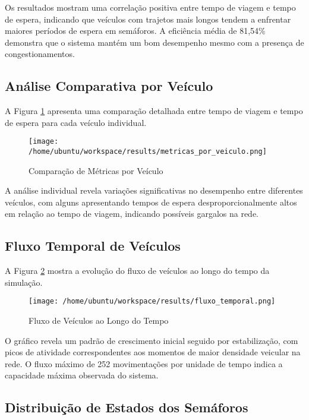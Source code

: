 \documentclass[12pt,a4paper]{article}
\begin{document}
Os resultados mostram uma correlação positiva entre tempo de viagem e tempo de espera, indicando que veículos com trajetos mais longos tendem a enfrentar maiores períodos de espera em semáforos. A eficiência média de 81,54\% demonstra que o sistema mantém um bom desempenho mesmo com a presença de congestionamentos.

\subsection{Análise Comparativa por Veículo}

A Figura \ref{fig:metricas_veiculo} apresenta uma comparação detalhada entre tempo de viagem e tempo de espera para cada veículo individual.

\begin{figure}[H]
\centering
\texttt{[image: /home/ubuntu/workspace/results/metricas\_por\_veiculo.png]}
\caption{Comparação de Métricas por Veículo}
\label{fig:metricas_veiculo}
\end{figure}

A análise individual revela variações significativas no desempenho entre diferentes veículos, com alguns apresentando tempos de espera desproporcionalmente altos em relação ao tempo de viagem, indicando possíveis gargalos na rede.

\subsection{Fluxo Temporal de Veículos}

A Figura \ref{fig:fluxo_temporal} mostra a evolução do fluxo de veículos ao longo do tempo da simulação.

\begin{figure}[H]
\centering
\texttt{[image: /home/ubuntu/workspace/results/fluxo\_temporal.png]}
\caption{Fluxo de Veículos ao Longo do Tempo}
\label{fig:fluxo_temporal}
\end{figure}

O gráfico revela um padrão de crescimento inicial seguido por estabilização, com picos de atividade correspondentes aos momentos de maior densidade veicular na rede. O fluxo máximo de 252 movimentações por unidade de tempo indica a capacidade máxima observada do sistema.

\subsection{Distribuição de Estados dos Semáforos}
\end{document}
